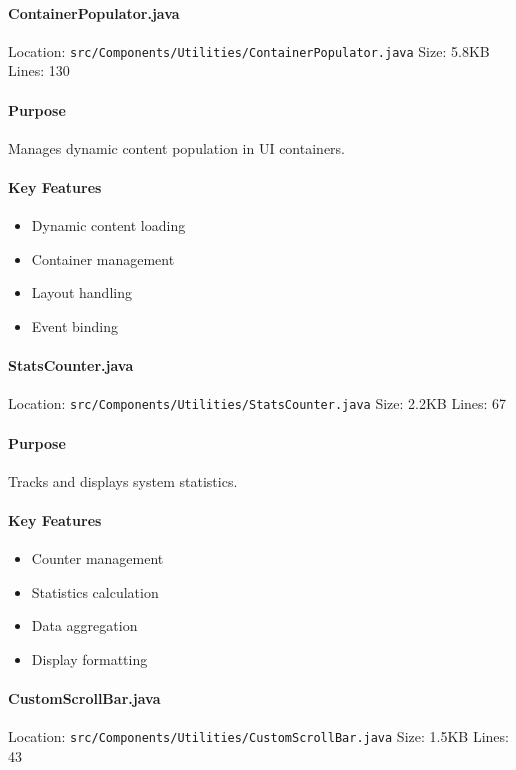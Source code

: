 \documentclass[12pt,a4paper]{article}
\begin{document}
\paragraph{ContainerPopulator.java}
Location: \texttt{src/Components/Utilities/ContainerPopulator.java}
Size: 5.8KB
Lines: 130

\paragraph{Purpose}
Manages dynamic content population in UI containers.

\paragraph{Key Features}
\begin{itemize}
    \item Dynamic content loading
    \item Container management
    \item Layout handling
    \item Event binding
\end{itemize}

\paragraph{StatsCounter.java}
Location: \texttt{src/Components/Utilities/StatsCounter.java}
Size: 2.2KB
Lines: 67

\paragraph{Purpose}
Tracks and displays system statistics.

\paragraph{Key Features}
\begin{itemize}
    \item Counter management
    \item Statistics calculation
    \item Data aggregation
    \item Display formatting
\end{itemize}

\paragraph{CustomScrollBar.java}
Location: \texttt{src/Components/Utilities/CustomScrollBar.java}
Size: 1.5KB
Lines: 43
\end{document}
